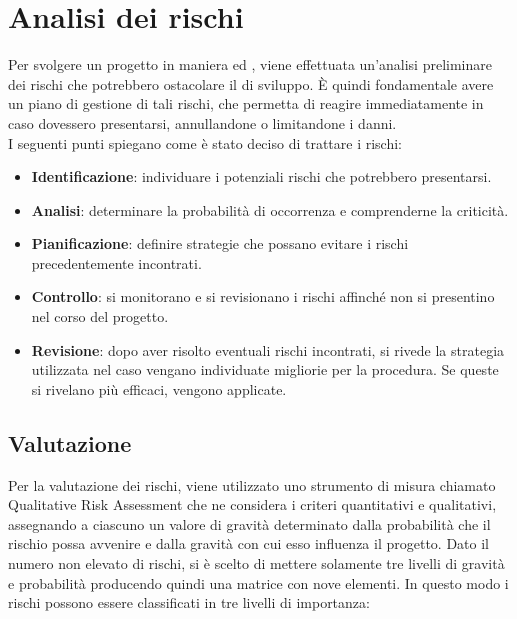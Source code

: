 \newpage
\section{Analisi dei rischi} \label{AnalisiDeiRischi}
	Per svolgere un progetto in maniera  ed , viene effettuata un'analisi preliminare dei rischi che potrebbero ostacolare il  di sviluppo.
	È quindi fondamentale avere un piano di gestione di tali rischi, che permetta di reagire immediatamente in caso dovessero presentarsi, annullandone o limitandone i danni.\\
	I seguenti punti spiegano come è stato deciso di trattare i rischi:
	\begin{itemize}
		\item \textbf{Identificazione}: individuare i potenziali rischi che potrebbero presentarsi.
		\item \textbf{Analisi}: determinare la probabilità di occorrenza e comprenderne la criticità.
		\item \textbf{Pianificazione}: definire strategie che possano evitare i rischi precedentemente incontrati.
		\item \textbf{Controllo}: si monitorano e si revisionano i rischi affinché non si presentino nel corso del progetto.
		\item \textbf{Revisione}: dopo aver risolto eventuali rischi incontrati, si rivede la strategia utilizzata nel caso vengano individuate migliorie per la procedura. Se queste si rivelano più efficaci, vengono applicate.
	\end{itemize}

	\subsection{Valutazione}
	Per la valutazione dei rischi, viene utilizzato uno strumento di misura chiamato Qualitative Risk Assessment che ne considera i criteri quantitativi e qualitativi,
	assegnando a ciascuno un valore di gravità determinato dalla probabilità che il rischio possa avvenire e dalla gravità con cui esso influenza il progetto.
	Dato il numero non elevato di rischi, si è scelto di mettere solamente tre livelli di gravità e probabilità producendo quindi una matrice con nove elementi. In
	questo modo i rischi possono essere classificati in tre livelli di importanza:

